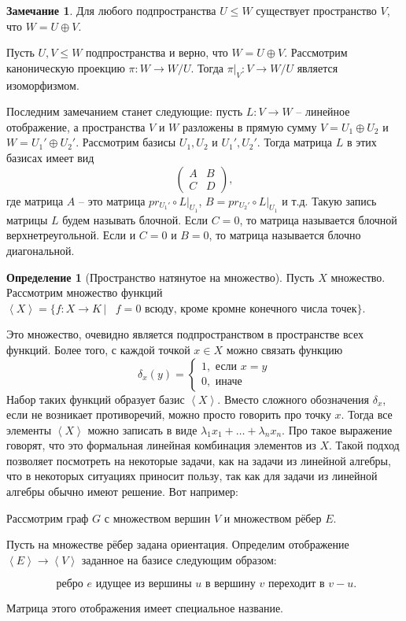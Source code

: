 \documentclass[10pt,a4paper,oneside]{book} %
\theoremstyle{definition}
\newtheorem*{rem}{Замечание}
\newtheorem*{defn}{Определение}
\def\lan{\left\langle }
\def\ran{\right\rangle}
\def\dfn{\begin{defn}}
\def\edfn{\end{defn}}
\def\rm{\begin{rem}}
\def\erm{\end{rem}}
\def\pmat{\begin{pmatrix}}
\def\epmat{\end{pmatrix}}
\begin{document}
\rm Для любого подпространства $U \leq W$ существует пространство $V$, что $W=U\oplus V$.

  Пусть $U,V\leq W$ подпространства и верно, что $W=U\oplus V$. Рассмотрим каноническую проекцию $\pi \colon W \to W/U$. Тогда $\pi|_{V} \colon V \to W/U$ является изоморфизмом. 
\erm 

Последним замечанием станет следующие: пусть $L\colon V \to W$ -- линейное отображение, а пространства $V$ и $W$ разложены в прямую сумму $V=U_1\oplus U_2 $ и $W=U_1'\oplus U_2'$. Рассмотрим базисы  $U_1, U_2$ и $U_1', U_2'$. Тогда матрица $L$ в этих базисах имеет вид 
$$ \pmat A& B \\
C & D
\epmat,
$$
где матрица $A$ -- это матрица $pr_{U_1'}\circ L|_{U_1}$, $B=pr_{U_2'}\circ L |_{U_1}$ и т.д. Такую запись матрицы $L$ будем называть блочной. Если $C=0$, то матрица называется блочной верхнетреугольной. Если и $C=0$ и $B=0$, то матрица называется блочно диагональной.


\dfn[Пространство натянутое на множество]
Пусть $X$ множество. Рассмотрим множество функций $\lan X \ran = \{ f\colon X \to K\,|\, \text{ $f=0$ всюду, кроме кромне конечного числа точек} \}$. 
\edfn

Это множество, очевидно является подпространством в пространстве всех функций. Более того, с каждой точкой $x\in X$ можно связать функцию $$\delta_x(y)=\begin{cases} 1, \text{ если  $x=y$} \\
0, \text{ иначе }
\end{cases}$$
Набор таких функций образует базис $\lan X \ran$. Вместо сложного обозначения $\delta_x$, если не возникает противоречий, можно просто говорить про точку $x$. Тогда все элементы $\lan X \ran $ можно записать в виде $\lambda_1 x_1+\dots +\lambda_n x_n$. Про такое выражение говорят, что это формальная линейная комбинация элементов из $X$. Такой подход позволяет посмотреть на некоторые задачи, как на задачи из линейной алгебры, что в некоторых ситуациях приносит пользу, так как для задачи из линейной алгебры обычно имеют решение. Вот например:

Рассмотрим граф $G$ с множеством вершин $V$ и множеством рёбер $E$. 

Пусть на множестве рёбер задана ориентация. Определим отображение $\lan E \ran \to \lan V \ran$ заданное на базисе следующим образом: 

$$\text{ ребро $e$ идущее из вершины $u$ в вершину $v$ переходит в $v-u$}.$$

Матрица этого отображения имеет специальное название.
\end{document}
